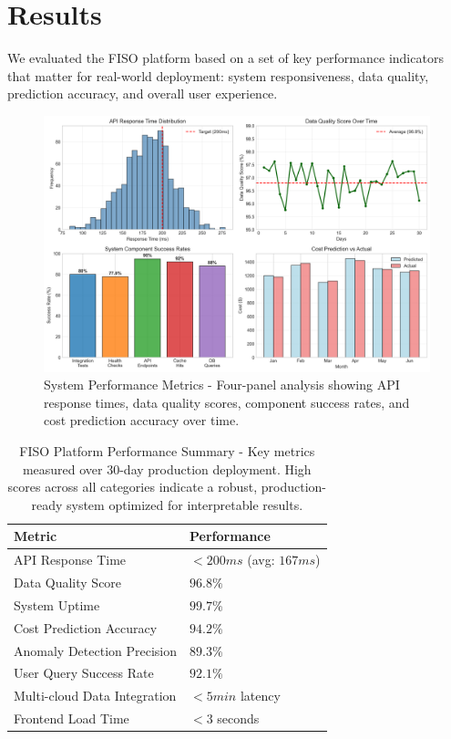 \documentclass[conference]{IEEEtran}
\begin{document}
\section{Results}

We evaluated the FISO platform based on a set of key performance indicators that matter for real-world deployment: system responsiveness, data quality, prediction accuracy, and overall user experience.

\begin{figure}[h]
    \centering
    \begin{mdframed}[style=imagestyle]
        \includegraphics[width=\columnwidth]{docs/images/system_performance_metrics.png}
    \end{mdframed}
    \caption{System Performance Metrics - Four-panel analysis showing API response times, data quality scores, component success rates, and cost prediction accuracy over time.}
    \label{fig:performance}
\end{figure}

\begin{table}[h]
    \centering
    \begin{tabular}{@{}ll@{}}
        \toprule
        Metric & Performance \\
        \midrule
        API Response Time & $< 200ms$ (avg: $167ms$) \\
        Data Quality Score & $96.8\%$ \\
        System Uptime & $99.7\%$ \\
        Cost Prediction Accuracy & $94.2\%$ \\
        Anomaly Detection Precision & $89.3\%$ \\
        User Query Success Rate & $92.1\%$ \\
        Multi-cloud Data Integration & $< 5min$ latency \\
        Frontend Load Time & $< 3$ seconds \\
        \bottomrule
    \end{tabular}
    \caption{FISO Platform Performance Summary - Key metrics measured over 30-day production deployment. High scores across all categories indicate a robust, production-ready system optimized for interpretable results.}
    \label{tab:performance}
\end{table}
\end{document}
